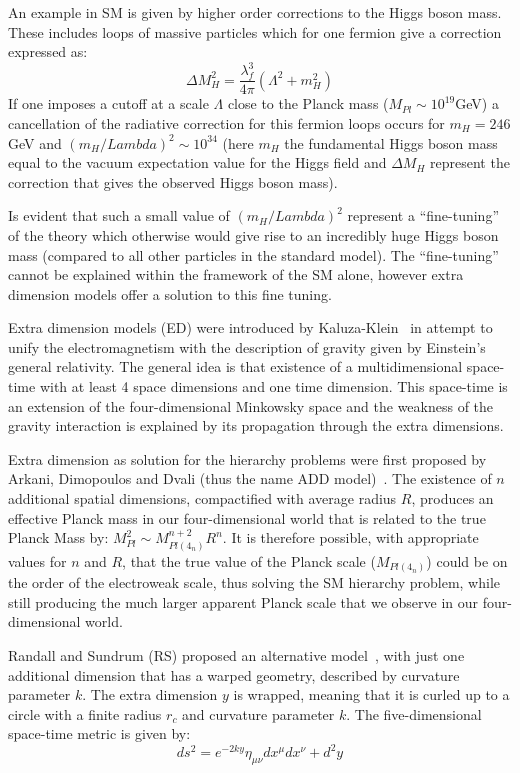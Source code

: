 An example in SM is given by higher order corrections to the Higgs boson mass. These includes loops of
massive particles which for one fermion give a correction expressed as:
\[
  \Delta M_H^2 = \frac{\lambda_f^3}{4\pi}(\Lambda^2 + m_H^2)
\]
If one imposes a cutoff at a scale $\Lambda$ close to the Planck mass ($M_{Pl}\sim 10^{19}$GeV) a cancellation
of the radiative correction for this fermion loops occurs for $m_H = 246$GeV and $(m_H/Lambda)^2 \sim 10^{34}$
(here $m_H$ the fundamental Higgs boson mass equal to the vacuum expectation value for the Higgs field and
$\Delta M_H$ represent the correction that gives the observed Higgs boson mass).

Is evident that such a small value of $(m_H/Lambda)^2$ represent a ``fine-tuning'' of the theory which otherwise
would give rise to an incredibly huge Higgs boson mass (compared to all other particles in the standard model).
The ``fine-tuning'' cannot be explained within the framework of the SM alone,
however extra dimension models offer a solution to this fine tuning.

Extra dimension models (ED) were introduced by Kaluza-Klein~\cite{kk} in attempt to unify the electromagnetism
with the description of gravity given by Einstein's general relativity.
The general idea is that existence of a multidimensional space-time with at least 4 space dimensions
and one time dimension. This space-time is an extension of the four-dimensional Minkowsky space and the weakness of
the gravity interaction is explained by its propagation through the extra dimensions.

Extra dimension as solution for the hierarchy problems were first proposed
by Arkani, Dimopoulos and Dvali (thus the name ADD model)~\cite{ADD}.
The existence of $n$ additional spatial dimensions, compactified with
average radius $R$, produces an effective Planck mass in our four-dimensional world that is related to the true
Planck Mass by: $M_{Pl}^2 \sim M_{Pl(4_n)}^{n+2}R^n$. It is therefore possible, with appropriate values for $n$
and $R$, that the true value of the Planck scale ($M_{Pl(4_n)}$) could be on the order of the electroweak scale,
thus solving the SM hierarchy problem, while still producing the much larger apparent Planck
scale that we observe in our four-dimensional world.

Randall and Sundrum (RS) proposed an alternative model~\cite{RS}, with just one additional dimension
that has a warped geometry, described by curvature parameter $k$. The extra dimension $y$
is wrapped, meaning that it is curled up to a circle with a finite radius $r_c$ and curvature parameter $k$.
The five-dimensional space-time metric is given by:
\begin{equation}
  ds^2 = e^{-2ky}\eta_{\mu\nu}dx^{\mu}dx^{\nu} + d^2y 
\end{equation}
\label{eq:extra_dim_metric}


